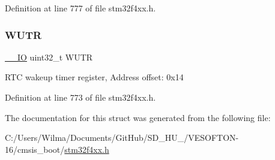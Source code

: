 Definition at line 777 of file stm32f4xx.\+h.

\mbox{\label{struct_r_t_c___type_def_ac5b3c8be61045a304d3076d4714d29f2}} 
\subsubsection{\texorpdfstring{W\+U\+TR}{WUTR}}
{\footnotesize\ttfamily \hyperlink{group___c_m_s_i_s__core__definitions_gaec43007d9998a0a0e01faede4133d6be}{\+\_\+\+\_\+\+IO} uint32\+\_\+t W\+U\+TR}

R\+TC wakeup timer register, Address offset\+: 0x14 

Definition at line 773 of file stm32f4xx.\+h.



The documentation for this struct was generated from the following file\+:\begin{DoxyCompactItemize}
\item 
C\+:/\+Users/\+Wilma/\+Documents/\+Git\+Hub/\+S\+D\+\_\+\+H\+U\+\_/\+V\+E\+S\+O\+F\+T\+O\+N-\/16/cmsis\+\_\+boot/\hyperlink{stm32f4xx_8h}{stm32f4xx.\+h}\end{DoxyCompactItemize}
